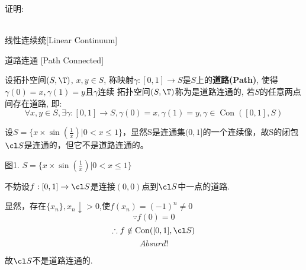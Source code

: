 \documentclass[UTF8]{ctexart}
\DeclareMathOperator{\Con}{Con}
\begin{document}
            证明: \[\]\\

            \begin{dfn}
                {线性连续统}[Linear Continuum]
                
            \end{dfn}

            \begin{dfn}
                {道路连通}
                [Path Connected]

                设拓扑空间$(S,\T)$, $x,y\in S$, 称映射$\gamma:[0,1]\to S$是$S$上的\textbf{道路(Path)}, 使得\(\gamma(0)=x,\gamma(1)=y\)且\(\gamma\)连续
                拓扑空间$(S,\T)$称为是道路连通的, 若$S$的任意两点间存在道路, 即:
                \[\forall x,y\in S, \exists\gamma:[0,1]\to S,\gamma(0)=x,\gamma(1)=y,\gamma\in\Con([0,1],S)\]
            \end{dfn}

            \begin{example}
                设\(S=\{x\times\sin(\frac{1}{x})|0<x\leq1\}\)，显然S是连通集\((0,1]\)的一个连续像，故S的闭包\(\cl S\)是连通的，但它不是道路连通的。


                \begin{center}
                    图1. \(S=\{x\times\sin(\frac{1}{x})|0<x\leq1\}\)
                \end{center}
            \end{example}
            
            \begin{prf}
                不妨设\(f:[0,1]\to \cl S\)是连接\((0,0)\)点到\(\cl S\)中一点的道路.

                显然，存在\(\{x_n\},x_n\downarrow>0\),使\(f(x_n)=(-1)^n\neq0\)
                \[\because f(0)=0\]
                \[\therefore f\notin\Con([0,1],\cl S)\]
                \[Absurd!\]

                故\(\cl S\)不是道路连通的.
            \end{prf}
\end{document}
